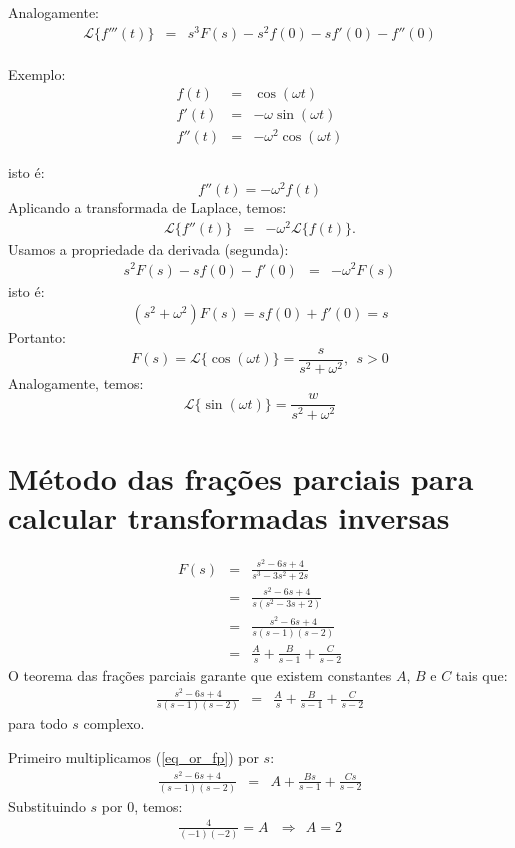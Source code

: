 \documentclass[a4paper,10pt]{book}
\begin{document}
 Analogamente:
 \begin{eqnarray*}
 \mathcal{L}\{f'''(t)\}
  &=&s^3F(s)-s^2f(0)-sf'(0)-f''(0)\\
 \end{eqnarray*}

 
 Exemplo:
 \begin{eqnarray*}f(t)&=&\cos(\omega t)\\
 f'(t)&=&-\omega\sin(\omega t)\\
 f''(t)&=&-\omega^2\cos(\omega t)
 \end{eqnarray*}
 
 isto é:
 $$f''(t)=-\omega^2f(t)$$
 Aplicando a transformada de Laplace, temos:
 \begin{eqnarray*}
 \mathcal{L}\{f''(t)\}&=&-\omega^2\mathcal{L}\{ f(t)\}.
 \end{eqnarray*}
 Usamos a propriedade da derivada (segunda):
 \begin{eqnarray*}
 s^2F(s)-sf(0)-f'(0)&=&-\omega^2F(s)
 \end{eqnarray*}
 isto é:
 \begin{eqnarray*}
 (s^2+\omega^2)F(s)=sf(0)+f'(0)=s
 \end{eqnarray*}
 Portanto:
 $$F(s)=\mathcal{L}\{\cos(\omega t)\}=\frac{s}{s^2+\omega^2},~~s>0$$
% 
 Analogamente, temos:
 $$\mathcal{L}\{\sin(\omega t)\}=\frac{w}{s^2+\omega^2}$$
 
 \section{Método das frações parciais para calcular transformadas inversas
 }
% 
 \begin{eqnarray*}F(s)&=&\frac{s^2-6s+4}{s^3-3s^2+2s}\\
 &=&\frac{s^2-6s+4}{s(s^2-3s+2)}\\
 &=&\frac{s^2-6s+4}{s(s-1)(s-2)}\\
 &=&\frac{A}{s}+\frac{B}{s-1}+\frac{C}{s-2}
 \end{eqnarray*}
% 
 O teorema das frações parciais garante que existem constantes $A$, $B$ e $C$ tais que:
 \begin{eqnarray}\label{eq_or_fp}\frac{s^2-6s+4}{s(s-1)(s-2)}
 &=&\frac{A}{s}+\frac{B}{s-1}+\frac{C}{s-2}
 \end{eqnarray}
 para todo $s$ complexo.

 
Primeiro multiplicamos (\ref{eq_or_fp}) por $s$:
\begin{eqnarray*}\frac{s^2-6s+4}{(s-1)(s-2)}
 &=&A+\frac{Bs}{s-1}+\frac{Cs}{s-2}
 \end{eqnarray*}
Substituindo $s$ por $0$, temos:
\begin{eqnarray*}\frac{4}{(-1)(-2)}
 =A~~~\Longrightarrow ~~ A=2
 \end{eqnarray*}
\end{document}
